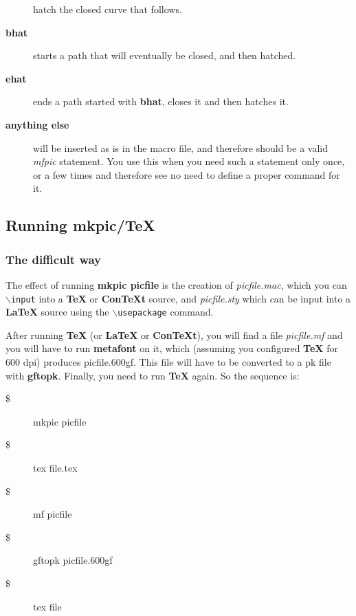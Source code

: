 \documentclass[a4paper,twocolumn]{article}
\begin{document}
\begin{description}
hatch the closed curve that follows.

\item[{\textbf{bhat}}] 

starts a path that will eventually be closed, and then hatched.

\item[{\textbf{ehat}}] 

ends a path started with \textbf{bhat}, closes it and then hatches it.

\item[{\textbf{anything else}}] 

will be inserted as is in the macro file, and therefore should be a
valid \textit{mfpic} statement. You use this when you need such a statement
only once, or a few times and therefore see no need to define a proper
command for it.

\end{description}
\subsection{Running mkpic/TeX\label{RUNNING_mkpic_TeX}}
\subsubsection*{The difficult way\label{The_difficult_way}}

The effect of running \textbf{mkpic picfile} is the creation of
\emph{picfile.mac}, which you can \texttt{$\backslash$input} into a \textbf{TeX} or \textbf{ConTeXt} source,
and \emph{picfile.sty} which can be input into a \textbf{LaTeX} source using the
\texttt{$\backslash$usepackage} command.

After running \textbf{TeX} (or \textbf{LaTeX} or \textbf{ConTeXt}), you will find a file
\emph{picfile.mf} and you will have to run \textbf{metafont} on it, which
(assuming you configured \textbf{TeX} for 600 dpi) produces picfile.600gf. This
file will have to be converted to a pk file with \textbf{gftopk}. Finally, you
need to run \textbf{TeX} again. So the sequence is:

\begin{description}

\item[{\$}] 

mkpic picfile

\item[{\$}] 

tex file.tex

\item[{\$}] 

mf picfile

\item[{\$}] 

gftopk picfile.600gf

\item[{\$}] 

tex file

\end{description}
\end{document}
